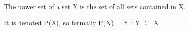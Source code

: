 The power set of a set X is the set of all sets contained in X.
\par
It is denoted P(X), so formally P(X) = { Y : Y $ \subseteq $ X } .